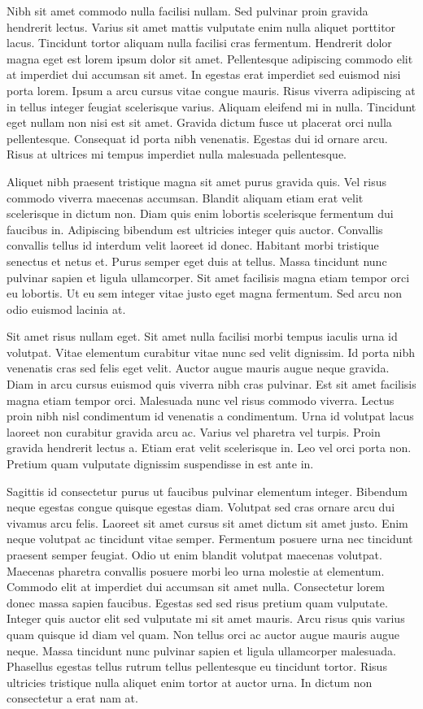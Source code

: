 \documentclass[10pt,landscape]{article}
\begin{document}
\begin{multicols}{3}
Nibh sit amet commodo nulla facilisi nullam. Sed pulvinar proin
gravida hendrerit lectus. Varius sit amet mattis vulputate enim nulla
aliquet porttitor lacus. Tincidunt tortor aliquam nulla facilisi cras
fermentum. Hendrerit dolor magna eget est lorem ipsum dolor sit
amet. Pellentesque adipiscing commodo elit at imperdiet dui accumsan
sit amet. In egestas erat imperdiet sed euismod nisi porta
lorem. Ipsum a arcu cursus vitae congue mauris. Risus viverra
adipiscing at in tellus integer feugiat scelerisque varius. Aliquam
eleifend mi in nulla. Tincidunt eget nullam non nisi est sit
amet. Gravida dictum fusce ut placerat orci nulla
pellentesque. Consequat id porta nibh venenatis. Egestas dui id ornare
arcu. Risus at ultrices mi tempus imperdiet nulla malesuada
pellentesque.

Aliquet nibh praesent tristique magna sit amet purus gravida quis. Vel
risus commodo viverra maecenas accumsan. Blandit aliquam etiam erat
velit scelerisque in dictum non. Diam quis enim lobortis scelerisque
fermentum dui faucibus in. Adipiscing bibendum est ultricies integer
quis auctor. Convallis convallis tellus id interdum velit laoreet id
donec. Habitant morbi tristique senectus et netus et. Purus semper
eget duis at tellus. Massa tincidunt nunc pulvinar sapien et ligula
ullamcorper. Sit amet facilisis magna etiam tempor orci eu
lobortis. Ut eu sem integer vitae justo eget magna fermentum. Sed arcu
non odio euismod lacinia at.

Sit amet risus nullam eget. Sit amet nulla facilisi morbi tempus
iaculis urna id volutpat. Vitae elementum curabitur vitae nunc sed
velit dignissim. Id porta nibh venenatis cras sed felis eget
velit. Auctor augue mauris augue neque gravida. Diam in arcu cursus
euismod quis viverra nibh cras pulvinar. Est sit amet facilisis magna
etiam tempor orci. Malesuada nunc vel risus commodo viverra. Lectus
proin nibh nisl condimentum id venenatis a condimentum. Urna id
volutpat lacus laoreet non curabitur gravida arcu ac. Varius vel
pharetra vel turpis. Proin gravida hendrerit lectus a. Etiam erat
velit scelerisque in. Leo vel orci porta non. Pretium quam vulputate
dignissim suspendisse in est ante in.

Sagittis id consectetur purus ut faucibus pulvinar elementum
integer. Bibendum neque egestas congue quisque egestas diam. Volutpat
sed cras ornare arcu dui vivamus arcu felis. Laoreet sit amet cursus
sit amet dictum sit amet justo. Enim neque volutpat ac tincidunt vitae
semper. Fermentum posuere urna nec tincidunt praesent semper
feugiat. Odio ut enim blandit volutpat maecenas volutpat. Maecenas
pharetra convallis posuere morbi leo urna molestie at
elementum. Commodo elit at imperdiet dui accumsan sit amet
nulla. Consectetur lorem donec massa sapien faucibus. Egestas sed sed
risus pretium quam vulputate. Integer quis auctor elit sed vulputate
mi sit amet mauris. Arcu risus quis varius quam quisque id diam vel
quam. Non tellus orci ac auctor augue mauris augue neque. Massa
tincidunt nunc pulvinar sapien et ligula ullamcorper
malesuada. Phasellus egestas tellus rutrum tellus pellentesque eu
tincidunt tortor. Risus ultricies tristique nulla aliquet enim tortor
at auctor urna. In dictum non consectetur a erat nam at.


\end{multicols}
\end{document}
